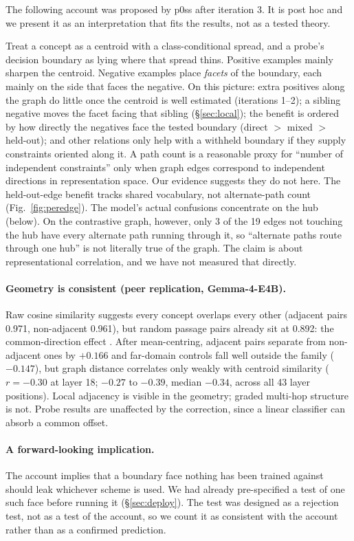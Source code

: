 \documentclass[11pt]{article}
\begin{document}
The following account was proposed by p0ss after iteration 3. It is post hoc and we present it as an
interpretation that fits the results, not as a tested theory.

Treat a concept as a centroid with a class-conditional spread, and a probe's decision boundary as lying where that
spread thins. Positive examples mainly sharpen the centroid. Negative examples place \emph{facets} of the
boundary, each mainly on the side that faces the negative. On this picture: extra positives along the graph do
little once the centroid is well estimated (iterations 1--2); a sibling negative moves the facet facing that
sibling (\S\ref{sec:local}); the benefit is ordered by how directly the negatives face the tested boundary (direct
$>$ mixed $>$ held-out); and other relations only help with a withheld boundary if they supply constraints oriented
along it. A path count is a reasonable proxy for ``number of independent constraints'' only when graph edges
correspond to independent directions in representation space. Our evidence suggests they do not here. The
held-out-edge benefit tracks shared vocabulary, not alternate-path count (Fig.~\ref{fig:peredge}). The model's
actual confusions concentrate on the hub (below). On the contrastive graph, however, only 3 of the 19 edges not
touching the hub have every alternate path running through it, so ``alternate paths route through one hub'' is
not literally true of the graph. The claim is about representational correlation, and we have not measured that
directly.

\paragraph{Geometry is consistent (peer replication, Gemma-4-E4B).} Raw cosine similarity suggests every concept
overlaps every other (adjacent pairs 0.971, non-adjacent 0.961), but random passage pairs already sit at 0.892:
the common-direction effect \citep{ethayarajh2019contextual}. After mean-centring, adjacent pairs separate from
non-adjacent ones by $+0.166$ and far-domain controls fall well outside the family ($-0.147$), but graph distance
correlates only weakly with centroid similarity ($r=-0.30$ at layer 18; $-0.27$ to $-0.39$, median $-0.34$, across
all 43 layer positions). Local adjacency is visible in the geometry; graded multi-hop structure is not. Probe
results are unaffected by the correction, since a linear classifier can absorb a common offset.

\paragraph{A forward-looking implication.} The account implies that a boundary face nothing has been trained
against should leak whichever scheme is used. We had already pre-specified a test of one such face before running
it (\S\ref{sec:deploy}). The test was designed as a rejection test, not as a test of the account, so we count it
as consistent with the account rather than as a confirmed prediction.
\end{document}
